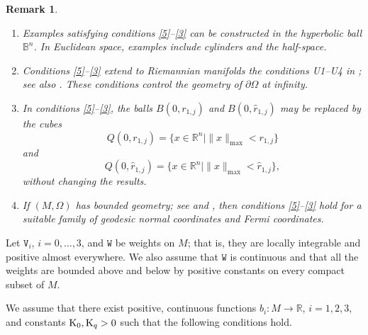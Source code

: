 \documentclass[reqno, 11pt, a4paper]{amsart}
\newtheorem{remark}[theorem]{Remark}
\numberwithin{equation}{section}
\newcommand{\ck}{\textnormal K}
\newcommand{\wghtv}{\mathtt{V}}
\newcommand{\wghtw}{\mathtt{W}}
\newcommand{\rd}{\textnormal{R}}
\newcommand{\qxp}{q}
\begin{document}
\begin{remark} $ $
\begin{enumerate}[label=(\roman*)] 


\item Examples satisfying conditions \ref{5}--\ref{3} can be constructed in the hyperbolic ball \(\mathbb B^n\). In Euclidean space, examples include cylinders and the half-space.

\item Conditions \ref{5}--\ref{3} extend to Riemannian manifolds the conditions U1--U4 in \cite{pfluger1998compactraces}; see also \cite{zbMATH01109876}. These conditions control the geometry of \(\partial\Omega\) at infinity.

\item \label{109} In conditions \ref{5}--\ref{3}, the balls \(B(0,r_{1,j})\) and \(B(0,\hat r_{1,j})\) may be replaced by the cubes
\[
Q(0,r_{1,j})
=\{x\in\mathbb R^n\mid\|x\|_{\max}<r_{1,j}\}
\]
and
\[
Q(0,\hat r_{1,j})
=\{x\in\mathbb R^n\mid\|x\|_{\max}<\hat r_{1,j}\},
\]
without changing the results.

\item If \((M,\Omega)\) has {\it bounded geometry}; see \cite[Definition 4.1]{zbMATH06237307} and \cite[Proposition 3.2]{zbMATH01606240}, then conditions \ref{5}--\ref{3} hold for a suitable family of {\it geodesic normal coordinates} and {\it Fermi coordinates}.





\end{enumerate}
\end{remark}








Let \(\wghtv_i\), \(i=0,\ldots,3\), and \(\wghtw\) be weights on \(M\); that is, they are locally integrable and positive almost everywhere. We also assume that \(\wghtw\) is continuous and that all the weights are bounded above and below by positive constants on every compact subset of \(M\).




We assume that there exist positive, continuous functions $b_i:M\rightarrow\mathbb R$, $i=1,2,3$, and constants $\ck_0,\ck_{\qxp}>0$ such that the following conditions hold.
\end{document}
